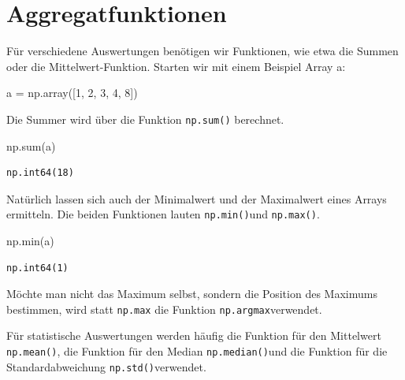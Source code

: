 \documentclass[
  letterpaper,
  DIV=11,
  numbers=noendperiod]{scrreprt}
\newenvironment{Shaded}{\begin{snugshade}}{\end{snugshade}}
\newcommand{\BuiltInTok}[1]{\textcolor[rgb]{0.00,0.23,0.31}{#1}}
\newcommand{\DecValTok}[1]{\textcolor[rgb]{0.68,0.00,0.00}{#1}}
\newcommand{\NormalTok}[1]{\textcolor[rgb]{0.00,0.23,0.31}{#1}}
\newcommand{\OperatorTok}[1]{\textcolor[rgb]{0.37,0.37,0.37}{#1}}
\begin{document}
\section{Aggregatfunktionen}\label{aggregatfunktionen}

Für verschiedene Auswertungen benötigen wir Funktionen, wie etwa die
Summen oder die Mittelwert-Funktion. Starten wir mit einem Beispiel
Array a:

\begin{Shaded}
\begin{Highlighting}[]
\NormalTok{a }\OperatorTok{=}\NormalTok{ np.array([}\DecValTok{1}\NormalTok{, }\DecValTok{2}\NormalTok{, }\DecValTok{3}\NormalTok{, }\DecValTok{4}\NormalTok{, }\DecValTok{8}\NormalTok{])}
\end{Highlighting}
\end{Shaded}

Die Summer wird über die Funktion \texttt{np.sum()} berechnet.

\begin{Shaded}
\begin{Highlighting}[]
\NormalTok{np.}\BuiltInTok{sum}\NormalTok{(a)}
\end{Highlighting}
\end{Shaded}

\begin{verbatim}
np.int64(18)
\end{verbatim}

Natürlich lassen sich auch der Minimalwert und der Maximalwert eines
Arrays ermitteln. Die beiden Funktionen lauten \texttt{np.min()}und
\texttt{np.max()}.

\begin{Shaded}
\begin{Highlighting}[]
\NormalTok{np.}\BuiltInTok{min}\NormalTok{(a)}
\end{Highlighting}
\end{Shaded}

\begin{verbatim}
np.int64(1)
\end{verbatim}

Möchte man nicht das Maximum selbst, sondern die Position des Maximums
bestimmen, wird statt \texttt{np.max} die Funktion
\texttt{np.argmax}verwendet.

Für statistische Auswertungen werden häufig die Funktion für den
Mittelwert \texttt{np.mean()}, die Funktion für den Median
\texttt{np.median()}und die Funktion für die Standardabweichung
\texttt{np.std()}verwendet.
\end{document}
